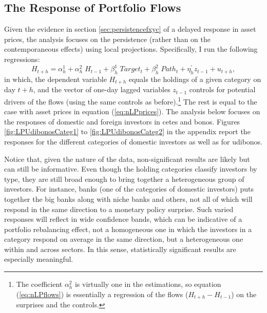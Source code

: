 \documentclass[a4paper, 12pt]{article}
\providecommand{\idxt}{t}
\providecommand{\idxh}{h}
\providecommand{\idxsfwd}{\idxt+\idxh}
\providecommand{\idxslag}{\idxt-1}
\providecommand{\ctrls}{z}
\providecommand{\hld}{H}
\providecommand{\rtdonereg}{Target_{\idxt}}
\providecommand{\rtdtworeg}{Path_{\idxt}}
\newcommand{\eqLPrhs}{\beta^{1}_{\idxh} \; \rtdonereg +  \beta^{2}_{\idxh} \; \rtdtworeg + \eta^{'}_{\idxh} \ctrls_{\idxslag}  + u_{\idxsfwd}}
\newcommand{\eqLPflows}{\hld_{\idxsfwd} = \alpha^{1}_{\idxh} + \alpha^{2}_{\idxh} \; \hld_{\idxslag} + \eqLPrhs}
\begin{document}
\subsection{The Response of Portfolio Flows} \label{sec:persistenceflows}
Given the evidence in section \ref{sec:persistencefxyc} of a delayed response in asset prices, the analysis focuses on the persistence (rather than on the contemporaneous effects) using local projections. 
Specifically, I run the following regressions:
\begin{equation} \label{eq:nLPflows}
	\eqLPflows,
\end{equation}	
\noindent in which, the dependent variable \(\hld_{\idxsfwd}\) equals the holdings of a given category on day \(\idxsfwd\),
and the vector of one-day lagged variables \(\ctrls_{\idxslag}\) controls for potential drivers of the flows (using the same controls as before).\footnote{The coefficient \(\alpha^{2}_{\idxh}\) is virtually one in the estimations, so equation (\ref{eq:nLPflows}) is essentially a regression of the flows (\(\hld_{\idxsfwd} - \hld_{\idxslag}\)) on the surprises and the controls.}  
The rest is equal to the case with asset prices in equation (\ref{eq:nLPprices}). 
The analysis below focuses on the responses of domestic and foreign investors in cetes and bonos. Figures \ref{fig:LPUdibonosCateg1} to \ref{fig:LPUdibonosCateg2} in the appendix report the responses for the different categories of domestic investors as well as for udibonos.

Notice that, given the nature of the data, non-significant results are likely but can still be informative. Even though the holding categories classify investors by type, they are still broad enough to bring together a heterogeneous group of investors. For instance, banks (one of the categories of domestic investors) puts together the big banks along with niche banks and others, not all of which will respond in the same direction to a monetary policy surprise. Such varied responses will reflect in wide confidence bands, which can be indicative of a portfolio rebalancing effect, not a homogeneous one in which the investors in a category respond on average in the same direction, but a heterogeneous one within and across sectors. In this sense, statistically significant results are especially meaningful.
\end{document}
